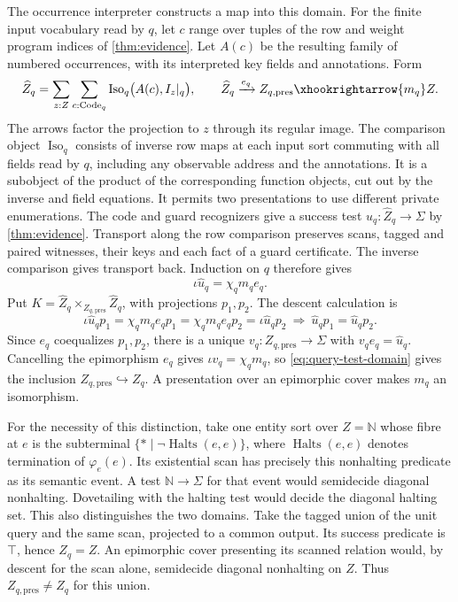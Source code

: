\documentclass[11pt,a4paper]{article}
\theoremstyle{definition}
\theoremstyle{remark}\newaliascnt{remark}{theorem}
\newcommand{\N}{\mathbb N}
\numberwithin{equation}{section}
\begin{document}
The occurrence interpreter constructs a map into this domain. For the finite input vocabulary read by $q$, let $c$ range over tuples of the row and weight program indices of \cref{thm:evidence}. Let $A(c)$ be the resulting family of numbered occurrences, with its interpreted key fields and annotations. Form
\[
 \widehat Z_q=\sum_{z:Z}\sum_{c:\mathrm{Code}_q}
     \operatorname{Iso}_q\bigl(A(c),I_z|_q\bigr),
 \qquad
 \widehat Z_q\xrightarrow{e_q}Z_{q,\mathrm{pres}}
            \xhookrightarrow{m_q} Z .
\]
The arrows factor the projection to $z$ through its regular image. The comparison object $\operatorname{Iso}_q$ consists of inverse row maps at each input sort commuting with all fields read by $q$, including any observable address and the annotations. It is a subobject of the product of the corresponding function objects, cut out by the inverse and field equations. It permits two presentations to use different private enumerations. The code and guard recognizers give a success test $\widehat u_q:\widehat Z_q\to\Sigma$ by \cref{thm:evidence}. Transport along the row comparison preserves scans, tagged and paired witnesses, their keys and each fact of a guard certificate. The inverse comparison gives transport back. Induction on $q$ therefore gives
\[
 \iota\widehat u_q=\chi_q m_q e_q .
\]
Put \(K=\widehat Z_q\times_{Z_{q,\mathrm{pres}}}\widehat Z_q\), with projections \(p_1,p_2\). The descent calculation is
\[
 \iota\widehat u_q p_1
   =\chi_qm_q e_qp_1=\chi_qm_q e_qp_2
   =\iota\widehat u_q p_2
 \ \Longrightarrow\ \widehat u_q p_1=\widehat u_q p_2 .
\]
Since \(e_q\) coequalizes \(p_1,p_2\), there is a unique \(v_q:Z_{q,\mathrm{pres}}\to\Sigma\) with \(v_qe_q=\widehat u_q\). Cancelling the epimorphism \(e_q\) gives \(\iota v_q=\chi_qm_q\), so \eqref{eq:query-test-domain} gives the inclusion \(Z_{q,\mathrm{pres}}\hookrightarrow Z_q\). A presentation over an epimorphic cover makes \(m_q\) an isomorphism.

For the necessity of this distinction, take one entity sort over $Z=\N$ whose fibre at $e$ is the subterminal $\{*\mid\neg\operatorname{Halts}(e,e)\}$, where $\operatorname{Halts}(e,e)$ denotes termination of $\varphi_e(e)$. Its existential scan has precisely this nonhalting predicate as its semantic event. A test $\N\to\Sigma$ for that event would semidecide diagonal nonhalting. Dovetailing with the halting test would decide the diagonal halting set. This also distinguishes the two domains. Take the tagged union of the unit query and the same scan, projected to a common output. Its success predicate is $\top$, hence $Z_q=Z$. An epimorphic cover presenting its scanned relation would, by descent for the scan alone, semidecide diagonal nonhalting on $Z$. Thus $Z_{q,\mathrm{pres}}\ne Z_q$ for this union.
\end{document}
